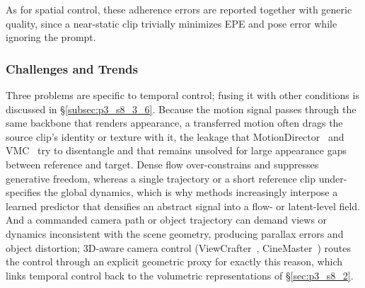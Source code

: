As for spatial control, these adherence errors are reported together with generic quality, since a near-static clip trivially minimizes EPE and pose error while ignoring the prompt.

\subsubsection{Challenges and Trends}
\label{subsubsec:p3_s8_3_3_challenges}
Three problems are specific to temporal control; fusing it with other conditions is discussed in §\ref{subsec:p3_s8_3_6}. Because the motion signal passes through the same backbone that renders appearance, a transferred motion often drags the source clip's identity or texture with it, the leakage that MotionDirector~\cite{zhao2024motiondirector} and VMC~\cite{jeong2024vmc} try to disentangle and that remains unsolved for large appearance gaps between reference and target. Dense flow over-constrains and suppresses generative freedom, whereas a single trajectory or a short reference clip under-specifies the global dynamics, which is why methods increasingly interpose a learned predictor that densifies an abstract signal into a flow- or latent-level field. And a commanded camera path or object trajectory can demand views or dynamics inconsistent with the scene geometry, producing parallax errors and object distortion; 3D-aware camera control (ViewCrafter~\cite{yu2024viewcrafter}, CineMaster~\cite{wang2025cinemaster}) routes the control through an explicit geometric proxy for exactly this reason, which links temporal control back to the volumetric representations of §\ref{sec:p3_s8_2}.
